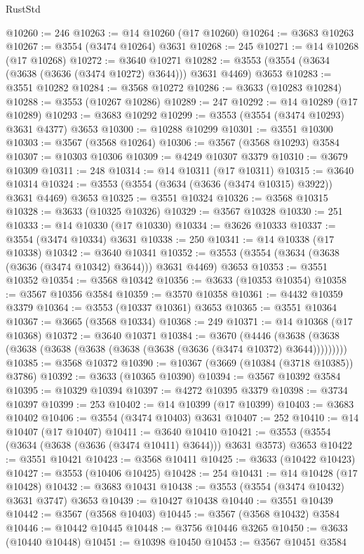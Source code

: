 \begin{lexlean}{RustStd}
\begin{coremodule}
@10260 := 246
@10263 := @14 @10260 (@17 @10260)
@10264 := @3683 @10263
@10267 := @3554 (@3474 @10264) @3631
@10268 := 245
@10271 := @14 @10268 (@17 @10268)
@10272 := @3640 @10271
@10282 := @3553 (@3554 (@3634 (@3638 (@3636 (@3474 @10272) @3644))) @3631 @4469) @3653
@10283 := @3551 @10282
@10284 := @3568 @10272
@10286 := @3633 (@10283 @10284)
@10288 := @3553 (@10267 @10286)
@10289 := 247
@10292 := @14 @10289 (@17 @10289)
@10293 := @3683 @10292
@10299 := @3553 (@3554 (@3474 @10293) @3631 @4377) @3653
@10300 := @10288 @10299
@10301 := @3551 @10300
@10303 := @3567 (@3568 @10264)
@10306 := @3567 (@3568 @10293) @3584
@10307 := @10303 @10306
@10309 := @4249 @10307 @3379
@10310 := @3679 @10309
@10311 := 248
@10314 := @14 @10311 (@17 @10311)
@10315 := @3640 @10314
@10324 := @3553 (@3554 (@3634 (@3636 (@3474 @10315) @3922)) @3631 @4469) @3653
@10325 := @3551 @10324
@10326 := @3568 @10315
@10328 := @3633 (@10325 @10326)
@10329 := @3567 @10328
@10330 := 251
@10333 := @14 @10330 (@17 @10330)
@10334 := @3626 @10333
@10337 := @3554 (@3474 @10334) @3631
@10338 := 250
@10341 := @14 @10338 (@17 @10338)
@10342 := @3640 @10341
@10352 := @3553 (@3554 (@3634 (@3638 (@3636 (@3474 @10342) @3644))) @3631 @4469) @3653
@10353 := @3551 @10352
@10354 := @3568 @10342
@10356 := @3633 (@10353 @10354)
@10358 := @3567 @10356 @3584
@10359 := @3570 @10358
@10361 := @4432 @10359 @3379
@10364 := @3553 (@10337 @10361) @3653
@10365 := @3551 @10364
@10367 := @3665 (@3568 @10334)
@10368 := 249
@10371 := @14 @10368 (@17 @10368)
@10372 := @3640 @10371
@10384 := @3670
    (@4446 (@3638 (@3638 (@3638 (@3638 (@3638 (@3638 (@3638 (@3636 (@3474 @10372) @3644)))))))))
@10385 := @3568 @10372
@10390 := @10367 (@3669 (@10384 (@3718 @10385)) @3786)
@10392 := @3633 (@10365 @10390)
@10394 := @3567 @10392 @3584
@10395 := @10329 @10394
@10397 := @4272 @10395 @3379
@10398 := @3734 @10397
@10399 := 253
@10402 := @14 @10399 (@17 @10399)
@10403 := @3683 @10402
@10406 := @3554 (@3474 @10403) @3631
@10407 := 252
@10410 := @14 @10407 (@17 @10407)
@10411 := @3640 @10410
@10421 := @3553 (@3554 (@3634 (@3638 (@3636 (@3474 @10411) @3644))) @3631 @3573) @3653
@10422 := @3551 @10421
@10423 := @3568 @10411
@10425 := @3633 (@10422 @10423)
@10427 := @3553 (@10406 @10425)
@10428 := 254
@10431 := @14 @10428 (@17 @10428)
@10432 := @3683 @10431
@10438 := @3553 (@3554 (@3474 @10432) @3631 @3747) @3653
@10439 := @10427 @10438
@10440 := @3551 @10439
@10442 := @3567 (@3568 @10403)
@10445 := @3567 (@3568 @10432) @3584
@10446 := @10442 @10445
@10448 := @3756 @10446 @3265
@10450 := @3633 (@10440 @10448)
@10451 := @10398 @10450
@10453 := @3567 @10451 @3584

\end{coremodule}
\end{lexlean}
